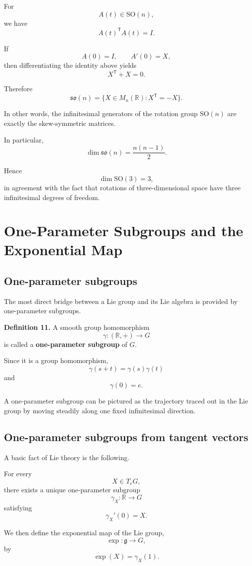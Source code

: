 \documentclass[11pt]{article}
\begin{document}
For
\[
A(t)\in\mathrm{SO}(n),
\]
we have
\[
A(t)^{\mathsf T}A(t)=I.
\]

If
\[
A(0)=I,
\qquad
A'(0)=X,
\]
then differentiating the identity above yields
\[
X^{\mathsf T}+X=0.
\]

Therefore
\[
\boxed{
\mathfrak{so}(n)
=
\{X\in M_n(\mathbb{R}):X^{\mathsf T}=-X\}.
}
\]

In other words, the infinitesimal generators of the rotation group $\mathrm{SO}(n)$ are exactly the skew-symmetric matrices.

In particular,
\[
\dim\mathfrak{so}(n)
=
\frac{n(n-1)}{2}.
\]

Hence
\[
\dim\mathrm{SO}(3)=3,
\]
in agreement with the fact that rotations of three-dimensional space have three infinitesimal degrees of freedom.


\section{One-Parameter Subgroups and the Exponential Map}

\subsection{One-parameter subgroups}

The most direct bridge between a Lie group and its Lie algebra is provided by one-parameter subgroups.

\textbf{Definition 11.}
A smooth group homomorphism
\[
\gamma:(\mathbb{R},+)\to G
\]
is called a \textbf{one-parameter subgroup} of $G$.

Since it is a group homomorphism,
\[
\gamma(s+t)
=
\gamma(s)\gamma(t)
\]
and
\[
\gamma(0)=e.
\]

A one-parameter subgroup can be pictured as the trajectory traced out in the Lie group by moving steadily along one fixed infinitesimal direction.


\subsection{One-parameter subgroups from tangent vectors}

A basic fact of Lie theory is the following.

For every
\[
X\in T_eG,
\]
there exists a unique one-parameter subgroup
\[
\gamma_X:\mathbb{R}\to G
\]
satisfying
\[
\gamma_X'(0)=X.
\]

We then define the exponential map of the Lie group,
\[
\exp:\mathfrak g\to G,
\]
by
\[
\boxed{
\exp(X)=\gamma_X(1).
}
\]
\end{document}
